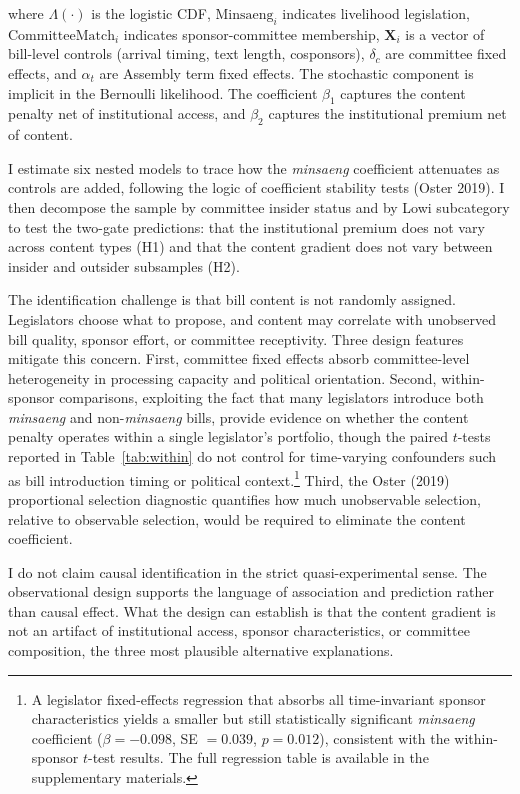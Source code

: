 \documentclass[11pt]{article}
\begin{document}
\noindent where $\Lambda(\cdot)$ is the logistic CDF, $\text{Minsaeng}_i$ indicates livelihood legislation, $\text{CommitteeMatch}_i$ indicates sponsor-committee membership, $\mathbf{X}_i$ is a vector of bill-level controls (arrival timing, text length, cosponsors), $\delta_c$ are committee fixed effects, and $\alpha_t$ are Assembly term fixed effects. The stochastic component is implicit in the Bernoulli likelihood. The coefficient $\beta_1$ captures the content penalty net of institutional access, and $\beta_2$ captures the institutional premium net of content.

I estimate six nested models to trace how the \emph{minsaeng} coefficient attenuates as controls are added, following the logic of coefficient stability tests (Oster 2019). I then decompose the sample by committee insider status and by Lowi subcategory to test the two-gate predictions: that the institutional premium does not vary across content types (H1) and that the content gradient does not vary between insider and outsider subsamples (H2).

The identification challenge is that bill content is not randomly assigned. Legislators choose what to propose, and content may correlate with unobserved bill quality, sponsor effort, or committee receptivity. Three design features mitigate this concern. First, committee fixed effects absorb committee-level heterogeneity in processing capacity and political orientation. Second, within-sponsor comparisons, exploiting the fact that many legislators introduce both \emph{minsaeng} and non-\emph{minsaeng} bills, provide evidence on whether the content penalty operates within a single legislator's portfolio, though the paired $t$-tests reported in Table~\ref{tab:within} do not control for time-varying confounders such as bill introduction timing or political context.\footnote{A legislator fixed-effects regression that absorbs all time-invariant sponsor characteristics yields a smaller but still statistically significant \emph{minsaeng} coefficient ($\beta = -0.098$, SE $= 0.039$, $p = 0.012$), consistent with the within-sponsor $t$-test results. The full regression table is available in the supplementary materials.} Third, the Oster (2019) proportional selection diagnostic quantifies how much unobservable selection, relative to observable selection, would be required to eliminate the content coefficient.

I do not claim causal identification in the strict quasi-experimental sense. The observational design supports the language of association and prediction rather than causal effect. What the design can establish is that the content gradient is not an artifact of institutional access, sponsor characteristics, or committee composition, the three most plausible alternative explanations.
\end{document}

